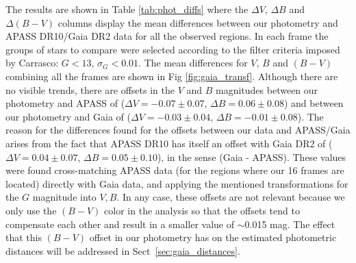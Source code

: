 \documentclass[draft]{aa}
\begin{document}
The results are shown in Table \ref{tab:phot_diffs} where the $\Delta V$,
$\Delta B$ and $\Delta (B-V)$ columns display the mean differences
between our photometry and APASS DR10/Gaia DR2 data for all the observed
regions.
%
In each frame the groups of stars to compare were selected according
to the filter criteria imposed by Carrasco: $G<13$, $\sigma_{G}<0.01$.
%
The mean differences for $V$, $B$ and $(B-V)$ combining all
the frames are shown in Fig \ref{fig:gaia_transf}. Although there are no
visible trends, there are offsets in the $V$ and $B$ magnitudes between our
photometry and APASS of ($\Delta V=-0.07\pm0.07$, $\Delta B=0.06\pm0.08$) and
between our photometry and Gaia of ($\Delta V=-0.03\pm0.04$,
$\Delta B=-0.01\pm0.08$).
%
The reason for the differences found for the offsets between our data and
APASS/Gaia arises from the fact that APASS DR10 has itself an offset with Gaia
DR2 of ($\Delta V=0.04\pm0.07$, $\Delta B=0.05\pm0.10$), in the sense (Gaia -
APASS).
These values were found cross-matching APASS data (for the regions where
our 16 frames are located) directly with Gaia data, and applying the mentioned
transformations for the $G$ magnitude into $V,B$.
%
In any case, these offsets are not relevant because we only use the $(B-V)$
color in the analysis so that the offsets tend to compensate each other
and result in a smaller value of $\sim$0.015 mag.
The effect that this $(B-V)$ offset in our photometry has on the estimated
photometric distances will be addressed in Sect~\ref{sec:gaia_distances}.\\
\end{document}
